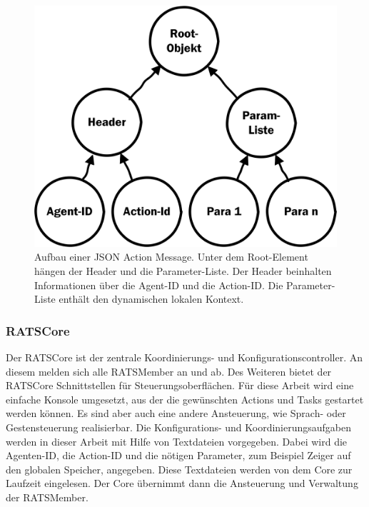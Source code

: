 \begin{figure}
	\centering
	\includegraphics[scale=1.0]{fig/jsonmsg}
	\caption[JSON Action Message]{Aufbau einer JSON Action Message. Unter dem Root-Element hängen der Header und die Parameter-Liste. Der Header beinhalten Informationen über die Agent-ID und die Action-ID. Die Parameter-Liste enthält den dynamischen lokalen Kontext.}
	\label{fig:jsonmsg}
\end{figure}

\subsubsection{RATSCore}
Der RATSCore ist der zentrale Koordinierungs- und Konfigurationscontroller. An diesem melden sich alle RATSMember an und ab. Des Weiteren bietet der RATSCore Schnittstellen für Steuerungsoberflächen. Für diese Arbeit wird eine einfache Konsole umgesetzt, aus der die gewünschten Actions und Tasks  gestartet werden können. Es sind aber auch eine andere Ansteuerung, wie Sprach- oder Gestensteuerung realisierbar. Die Konfigurations- und Koordinierungsaufgaben werden in dieser Arbeit mit Hilfe von Textdateien vorgegeben. Dabei wird die Agenten-ID, die Action-ID und die nötigen Parameter, zum Beispiel Zeiger auf den globalen Speicher, angegeben. Diese Textdateien werden von dem Core zur Laufzeit eingelesen. Der Core übernimmt dann die Ansteuerung und Verwaltung der RATSMember.

